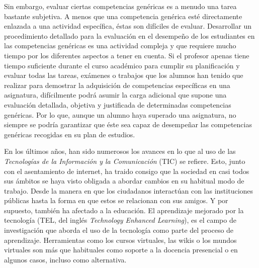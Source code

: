 Sin embargo, evaluar ciertas competencias genéricas es a menudo una tarea bastante subjetiva. A menos que una competencia genérica esté directamente enlazada a una actividad específica, éstas son difíciles de evaluar. Desarrollar un procedimiento detallado para la evaluación en el desempeño de los estudiantes en las competencias genéricas es una actividad compleja y que requiere mucho tiempo por los diferentes aspectos a tener en cuenta. Si el profesor apenas tiene tiempo suficiente durante el curso académico para cumplir su planificación y evaluar todas las tareas, exámenes o trabajos que los alumnos han tenido que realizar para demostrar la adquisición de competencias específicas en una asignatura, difícilmente podrá asumir la carga adicional que supone una evaluación detallada, objetiva y justificada de determinadas competencias genéricas. Por lo que, aunque un alumno haya superado una asignatura, no siempre se podría garantizar que éste sea capaz de desempeñar las competencias genéricas recogidas en su plan de estudios.

En los últimos años, han sido numerosos los avances en lo que al uso de las \emph{Tecnologías de la Información y la Comunicación} (TIC) se refiere. Esto, junto con el asentamiento de internet, ha traido consigo que la sociedad en casi todos sus ámbitos se haya visto obligada a abordar cambios en su habitual modo de trabajo. Desde la manera en que los ciudadanos interactúan con las instituciones públicas hasta la forma en que estos se relacionan con sus amigos. Y por supuesto, también ha afectado a la educación. El aprendizaje mejorado por la tecnología (TEL, del inglés \emph{Technology Enhanced Learning}), es el campo de investigación que aborda el uso de la tecnología como parte del proceso de aprendizaje. Herramientas como los cursos virtuales, las wikis o los mundos virtuales son más que habituales como soporte a la docencia presencial o en algunos casos, incluso como alternativa.

